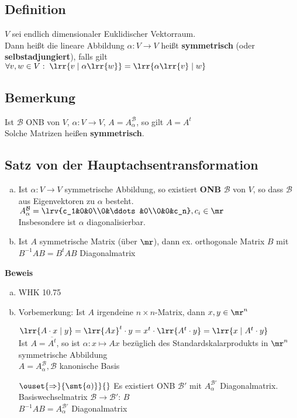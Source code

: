 \subsection{Definition}
	$V$ sei endlich dimensionaler Euklidischer Vektorraum.\\
	Dann heißt die lineare Abbildung $\alpha:V\rightarrow V$ heißt \textbf{symmetrisch} (oder \textbf{selbstadjungiert}), falls gilt $\forall v,w\in V:\;\lrr{v\mid\alpha\lrr{w}}=\lrr{\alpha\lrr{v}\mid w}$

\subsection{Bemerkung}
	Ist $\mathcal{B}$ ONB von $V$, $\alpha:V\rightarrow V$, $A=A_\alpha^{\mathcal{B}}$, so gilt $A=A^t$\\
	Solche Matrizen heißen \textbf{symmetrisch}.

\subsection{Satz von der Hauptachsentransformation}
	\begin{enumerate}[a)]
		\item Ist $\alpha: V\rightarrow V$ symmetrische Abbildung, so existiert \textbf{ONB} $\mathcal{B}$ von $V$, so dass $\mathcal{B}$ aus Eigenvektoren zu $\alpha$ besteht.\\
			$A_\alpha^{\mathcal{B}}=\lrv{c_1&0&0\\0&\ddots&0\\0&0&c_n}, c_i\in\mr$\\
			Insbesondere ist $\alpha$ diagonalisierbar.
		\item Ist $A$ symmetrische Matrix (über $\mr$), dann ex. orthogonale Matrix $B$ mit $B^{-1} A B =B^tAB$ Diagonalmatrix
	\end{enumerate}
	\textbf{Beweis}
	\begin{enumerate}[a)]
		\item WHK 10.75
		\item Vorbemerkung: Ist $A$ irgendeine $n\times n$-Matrix, dann $x,y\in\mr^n$
			
			$\lrr{A\cdot x\mid y} = \lrr{Ax}^t\cdot y = x^t\cdot\lrr{A^t\cdot y}=\lrr{x\mid A^t\cdot y}$\\
			Ist $A=\overline{A^t}$, so ist $\alpha: x\mapsto Ax$ bezüglich des Standardskalarprodukts in $\mr^n$ symmetrische Abbildung\\
			$A=A_\alpha^{\mathcal{B}}, \mathcal{B}$ kanonische Basis

			$\ouset{\Rightarrow}{\smt{a)}}{}$ Es existiert ONB $\mathcal{B}'$ mit $A_\alpha^{\mathcal{B}'}$ Diagonalmatrix.\\
			Basiswechselmatrix $\mathcal{B}\rightarrow\mathcal{B}'$: $B$\\
			$B^{-1}AB=A_\alpha^{\mathcal{B}'}$ Diagonalmatrix
	\end{enumerate}

